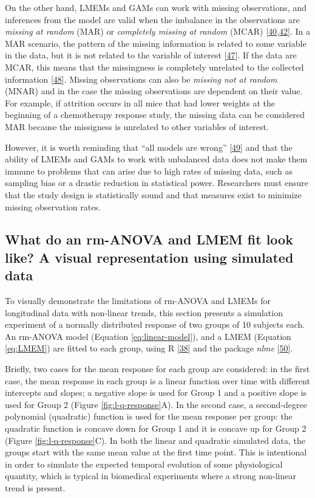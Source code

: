 \documentclass[
]{article}
\begin{document}
On the other hand, LMEMs and GAMs can work with missing observations, and inferences from the model are valid when the imbalance in the observations are \emph{missing at random} (MAR) or \emph{completely missing at random} (MCAR) {[}\protect\hyperlink{ref-west2014}{40},\protect\hyperlink{ref-weiss2005}{42}{]}. In a MAR scenario, the pattern of the missing information is related to some variable in the data, but it is not related to the variable of interest {[}\protect\hyperlink{ref-scheffer2002}{47}{]}. If the data are MCAR, this means that the missingness is completely unrelated to the collected information {[}\protect\hyperlink{ref-potthoff2006}{48}{]}. Missing observations can also be \emph{missing not at random} (MNAR) and in the case the missing observations are dependent on their value. For example, if attrition occurs in all mice that had lower weights at the beginning of a chemotherapy response study, the missing data can be considered MAR because the missigness is unrelated to other variables of interest.

However, it is worth reminding that ``all models are wrong'' {[}\protect\hyperlink{ref-box1976}{49}{]} and that the ability of LMEMs and GAMs to work with unbalanced data does not make them immune to problems that can arise due to high rates of missing data, such as sampling bias or a drastic reduction in statistical power. Researchers must ensure that the study design is statistically sound and that measures exist to minimize missing observation rates.

\hypertarget{simulation}{%
\subsection{What do an rm-ANOVA and LMEM fit look like? A visual representation using simulated data}\label{simulation}}

To visually demonstrate the limitations of rm-ANOVA and LMEMs for longitudinal data with non-linear trends, this section presents a simulation experiment of a normally distributed response of two groups of 10 subjects each. An rm-ANOVA model (Equation \eqref{eq:linear-model}), and a LMEM (Equation \eqref{eq:LMEM}) are fitted to each group, using R {[}\protect\hyperlink{ref-r}{38}{]} and the package \emph{nlme} {[}\protect\hyperlink{ref-nlme}{50}{]}.

Briefly, two cases for the mean response for each group are considered: in the first case, the mean response in each group is a linear function over time with different intercepts and slopes; a negative slope is used for Group 1 and a positive slope is used for Group 2 (Figure \ref{fig:l-q-response}A). In the second case, a second-degree polynomial (quadratic) function is used for the mean response per group: the quadratic function is concave down for Group 1 and it is concave up for Group 2 (Figure \ref{fig:l-q-response}C). In both the linear and quadratic simulated data, the groups start with the same mean value at the first time point. This is intentional in order to simulate the expected temporal evolution of some physiological quantity, which is typical in biomedical experiments where a strong non-linear trend is present.
\end{document}
